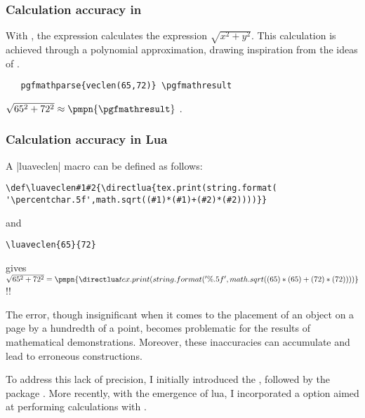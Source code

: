 \subsubsection{Calculation accuracy in \TIKZ}
With \TIKZ,  the expression  calculates the expression $\sqrt{x^2+y^2}$.
This calculation is achieved through a polynomial approximation, drawing inspiration from the ideas  of .

 
\begin{mybox}{}
\begin{verbatim}
   pgfmathparse{veclen(65,72)} \pgfmathresult
\end{verbatim}
\end{mybox}

 \tkzHand $\sqrt{65^2+72^2} \approx \pmpn{\pgfmathresult} $ \tkzRBomb.

\subsubsection{Calculation accuracy in Lua}
A |luaveclen| macro can be defined as follows:

\begin{mybox}{}
\begin{verbatim}
\def\luaveclen#1#2{\directlua{tex.print(string.format(
'\percentchar.5f',math.sqrt((#1)*(#1)+(#2)*(#2))))}}
\end{verbatim}
\end{mybox}

and

\begin{mybox}
\begin{verbatim}
\luaveclen{65}{72}
\end{verbatim}
\end{mybox}

gives
\tkzHand $\sqrt{65^2+72^2} = \pmpn{\luaveclen{65}{72}} $ {\color{red}!!}

The error, though insignificant when it comes to the placement of an object on a page by a hundredth of a point, becomes problematic for the results of mathematical demonstrations. Moreover, these inaccuracies can accumulate and lead to erroneous constructions.

\vspace{.5em}
To address this lack of precision, I initially introduced the , followed by the package . More recently, with the emergence of lua\LATEX{}, I incorporated a  option aimed at performing calculations with .

